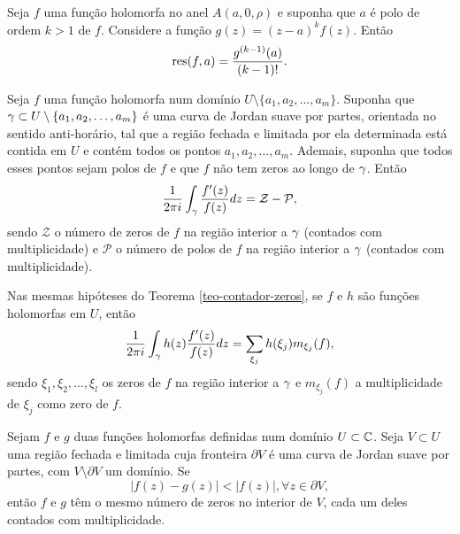 \begin{proposicao}
Seja $f$ uma função holomorfa no anel $A(a, 0, \rho)$ e suponha que $a$ é polo de ordem $k>1$ de $f$.
Considere a função $g(z) = (z-a)^k f(z)$. Então
\begin{equation*}
    \operatorname{res}(f, a) = \frac{g^{(k-1)}(a)}{(k-1)!}.
\end{equation*}
\end{proposicao}


\begin{teorema}
\label{teo-contador-zeros}
Seja $f$ uma função holomorfa num domínio $U\setminus\{ a_1, a_2, \dots, a_m \}$. Suponha que 
$\gamma \subset U\setminus\{ a_1, a_2, \dots, a_m \}$ é uma curva de Jordan suave por partes,
orientada no sentido anti-horário, tal que a região fechada e limitada por ela determinada está
contida em $U$ e contém todos os pontos $ a_1, a_2, \dots, a_m$. Ademais, suponha que todos esses
pontos sejam polos de $f$ e que $f$ não tem zeros ao longo de $\gamma$. Então
\begin{equation*}
    \frac{1}{2\pi i}\int_{\gamma} \frac{f'(z)}{f(z)} dz = \mathcal{Z} - \mathcal{P},
\end{equation*}
sendo $\mathcal{Z}$ o número de zeros de $f$ na região interior a $\gamma$ (contados com multiplicidade)
e $\mathcal{P}$ o número de polos de $f$ na região interior a $\gamma$ (contados com multiplicidade).
\end{teorema}


\begin{corolario}
Nas mesmas hipóteses do Teorema \ref{teo-contador-zeros}, se $f$ e $h$ são funções holomorfas em $U$,
então
\begin{equation*}
    \frac{1}{2\pi i}\int_{\gamma} h(z)\frac{f'(z)}{f(z)} dz = \sum_{\xi_j} h(\xi_j)m_{\xi_j}(f),
\end{equation*}
sendo $\xi_1, \xi_2, \dots, \xi_l$ os zeros de $f$ na região interior a $\gamma$ e $m_{\xi_j}(f)$
a multiplicidade de $\xi_j$ como zero de $f$.
\end{corolario}


\begin{teorema}
\label{teo-rouche}
Sejam $f$ e $g$ duas funções holomorfas definidas num domínio $U\subset\mathbb{C}$. Seja $V\subset U$
uma região fechada e limitada cuja fronteira $\partial V$ é uma curva de Jordan suave por partes, com
$V\setminus\partial V$ um domínio. Se
\begin{equation*}
    |f(z) - g(z)| < |f(z)|, \forall z\in\partial V,
\end{equation*}
então $f$ e $g$ têm o mesmo número de zeros no interior de $V$, cada um deles contados com multiplicidade.
\end{teorema}

